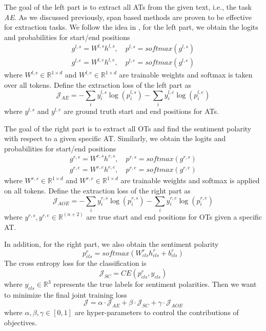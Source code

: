 \documentclass[letterpaper]{article} \usepackage{aaai21}  \usepackage{times}  \usepackage{helvet} \usepackage{courier}  \usepackage[hyphens]{url}  \usepackage{graphicx} \urlstyle{rm} \def\UrlFont{\rm}  \usepackage{natbib}  \usepackage{caption}
\begin{document}
The goal of the left part is to extract all ATs from the given text, i.e., the task \emph{AE}.
As we discussed previously, span based methods are proven to be effective for extraction tasks. 
We follow the idea in \cite{hu-etal-2019-open}, for the left part, we obtain the logits and probabilities for 
start/end positions 
\begin{eqnarray}
    g^{l,s} = W^{l,s} h^{l,s},\quad p^{l, s} = softmax(g^{l,s})  \\
    g^{l,e} = W^{l,e} h^{l,e},\quad p^{l, e} = softmax(g^{l,e})
\end{eqnarray}
where $W^{l,s}\in \mathbb{R}^{1 \times d}$ and $W^{l,e}\in \mathbb{R}^{1 \times d}$ are trainable weights and softmax is taken over all tokens. 
Define the extraction loss of the left part as  
\begin{equation}
    \mathcal{J}_{AE} = - \sum_{i} y^{l,s}_i \log(p^{l,s}_i) 
- \sum_i y^{l,e}_i \log(p^{l,e}_i)
\end{equation}
where $y^{l,s} $ and $y^{l,e} $ are ground truth start and end positions for ATs.

The goal of the right part is to extract all OTs and find the sentiment polarity with respect to a given specific AT. 
Similarly, we obtain the logits and probabilities for 
start/end positions 
\begin{eqnarray}
    g^{r,s} = W^{r,s} h^{r,s},\quad p^{r, s} = softmax(g^{r,s}) \\
    g^{r,e} = W^{r,e} h^{r,e},\quad p^{r, e} = softmax(g^{r,e})
\end{eqnarray}
where $W^{r,s}\in \mathbb{R}^{1 \times d}$ and $W^{r,e}\in \mathbb{R}^{1 \times d}$ are trainable weights and softmax is applied on all tokens. 
Define the extraction loss of the right part as  
\begin{equation}\mathcal{J}_{AOE} = - \sum_{i} y^{r,s}_i \log(p^{r,s}_i) 
- \sum_i y^{r,e}_i \log(p^{r,e}_i)
\end{equation}
where $y^{r,s}, y^{r,e} \in \mathbb{R}^{(n+2)}$ are true start and end positions for OTs given a specific AT.

In addition, for the right part, we also obtain the sentiment polarity 
\begin{equation}
    p^{r}_{cls} = softmax(W^{r}_{cls}h^{r}_{cls}+b^{r}_{cls})
\end{equation}
The cross entropy loss for the classification is 
\begin{equation}
    \mathcal{J}_{SC} = CE(p^{r}_{cls}, y_{cls})
\end{equation}
where $y_{cls}\in \mathbb{R}^{3}$ represents the true labels for sentiment polarities.
Then we want to minimize the final joint training loss 
\begin{equation}
    \mathcal{J} = \alpha \cdot \mathcal{J}_{AE} + \beta \cdot \mathcal{J}_{SC}+ \gamma \cdot \mathcal{J}_{AOE} \label{eqn_loss}
\end{equation}
where $\alpha,\beta, \gamma \in [0, 1]$ are hyper-parameters to control the contributions of objectives.
\end{document}

